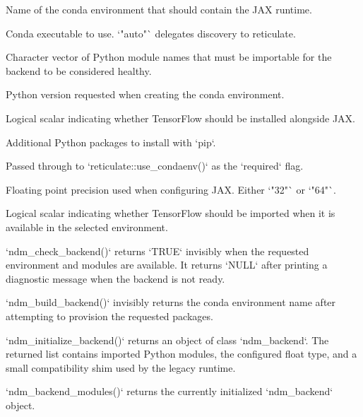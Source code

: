 \documentclass[a4paper]{book}
\begin{document}
%
\begin{Arguments}
\begin{ldescription}
\item[\code{conda\_env}] Name of the conda environment that should contain the JAX
runtime.

\item[\code{conda}] Conda executable to use. `"auto"` delegates discovery to
reticulate.

\item[\code{modules}] Character vector of Python module names that must be importable
for the backend to be considered healthy.

\item[\code{python\_version}] Python version requested when creating the conda
environment.

\item[\code{include\_tensorflow}] Logical scalar indicating whether TensorFlow should
be installed alongside JAX.

\item[\code{extra\_packages}] Additional Python packages to install with `pip`.

\item[\code{conda\_env\_required}] Passed through to `reticulate::use\_condaenv()` as
the `required` flag.

\item[\code{float\_type}] Floating point precision used when configuring JAX. Either
`"32"` or `"64"`.

\item[\code{import\_tensorflow}] Logical scalar indicating whether TensorFlow should
be imported when it is available in the selected environment.
\end{ldescription}
\end{Arguments}
%
\begin{Value}
`ndm\_check\_backend()` returns `TRUE` invisibly when the requested
environment and modules are available. It returns `NULL` after printing a
diagnostic message when the backend is not ready.

`ndm\_build\_backend()` invisibly returns the conda environment name
after attempting to provision the requested packages.

`ndm\_initialize\_backend()` returns an object of class
`ndm\_backend`. The returned list contains imported Python modules, the
configured float type, and a small compatibility shim used by the legacy
runtime.

`ndm\_backend\_modules()` returns the currently initialized
`ndm\_backend` object.
\end{Value}
\end{document}
